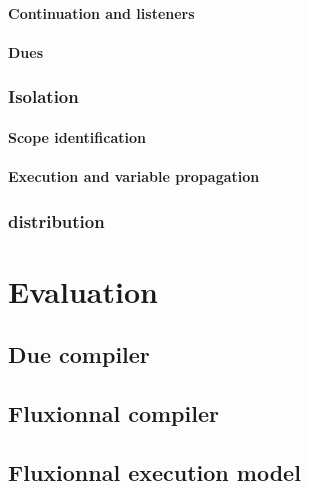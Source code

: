\documentclass[12pt]{report}
\begin{document}
      \subsubsection{Continuation and listeners}
      \subsubsection{Dues}
    \subsection{Isolation}
      \subsubsection{Scope identification}
      \subsubsection{Execution and variable propagation}
    \subsection{distribution}



\chapter{Evaluation}

  \section{Due compiler}

  \section{Fluxionnal compiler}

  \section{Fluxionnal execution model}




\printbibliography[]
\end{document}
